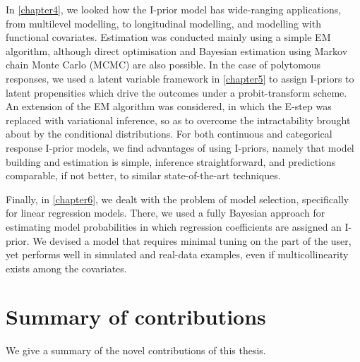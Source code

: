 \documentclass[11pt,twoside,openright]{report}
\begin{document}
In \cref{chapter4}, we looked how the I-prior model has wide-ranging applications, from multilevel modelling, to longitudinal modelling, and modelling with functional covariates.
Estimation was conducted mainly using a simple EM algorithm, although direct optimisation and Bayesian estimation using Markov chain Monte Carlo (MCMC) are also possible.
In the case of polytomous responses, we used a latent variable framework in \cref{chapter5} to assign I-priors to latent propensities which drive the outcomes under a probit-transform scheme. 
An extension of the EM algorithm was considered, in which the E-step was replaced with variational inference, so as to overcome the intractability brought about by the conditional distributions.
For both continuous and categorical response I-prior models, we find advantages of using I-priors, namely that model building and estimation is simple, inference  straightforward, and predictions comparable, if not better, to similar state-of-the-art techniques.

Finally, in \cref{chapter6}, we dealt with the problem of model selection, specifically for linear regression models.
There, we used a fully Bayesian approach for estimating model probabilities in which  regression coefficients are assigned an I-prior.
We devised a model that requires minimal tuning on the part of the user, yet performs well in simulated and real-data examples, even if multicollinearity exists among the covariates.


\section{Summary of contributions}

We give a summary of the novel contributions of this thesis.
\end{document}
